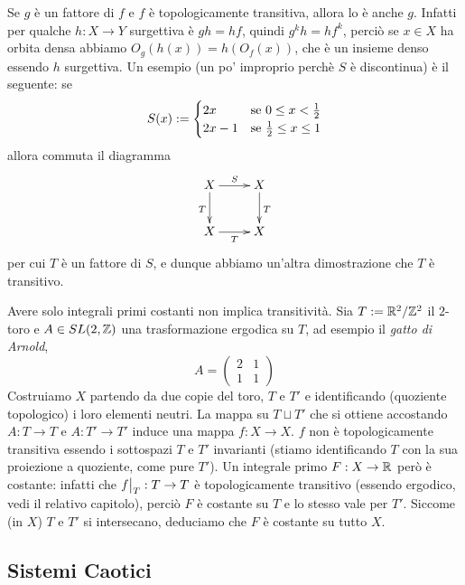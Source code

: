 \begin{esempio} Se $g$ è un fattore di $f$ e $f$ è topologicamente transitiva, allora lo è anche $g$.
Infatti per qualche $h:X\to Y$ surgettiva è $gh=hf$, quindi $g^k h=h f^k$, perciò
se $x\in X$ ha orbita densa abbiamo $O_g(h(x))=h(O_f(x))$, che è un insieme denso essendo $h$ surgettiva.\newline
Un esempio (un po' improprio perchè $S$ è discontinua) è il seguente: se
\[S(x):=\begin{cases}2x &\text{se }0\le x<\frac{1}{2} \\ 2x-1 &\text{se }\frac{1}{2}\le x\le 1\end{cases}\]
allora commuta il diagramma
\[ \xymatrix{X \ar[r]^S \ar[d]_T & X \ar[d]^T \\ X \ar[r]_T & X} \]
per cui $T$ è un fattore di $S$, e dunque abbiamo un'altra dimostrazione che $T$ è transitivo. 
\end{esempio}



\begin{esempio}[facoltativo] Avere solo integrali primi costanti non implica transitività. Sia $T:=\mathbb{R}^2/\mathbb{Z}^2$ il $2$-toro e $A\in SL(2,\mathbb{Z})$ una trasformazione ergodica
su $T$, ad esempio il \emph{gatto di Arnold},
\[A=\begin{pmatrix} 2 & 1 \\ 1 & 1 \end{pmatrix}\]
Costruiamo $X$ partendo da due copie del toro, $T$ e $T'$ e identificando (quoziente topologico) i loro elementi neutri. 
La mappa su $T\sqcup T'$ che si ottiene accostando $A:T\to T$ e $A:T'\to T'$ induce una mappa $f:X\to X$.
$f$ non è topologicamente transitiva essendo i sottospazi $T$ e $T'$ invarianti (stiamo identificando $T$ con la sua proiezione a quoziente,
come pure $T'$).
Un integrale primo $F:X\to \mathbb{R}$ però è costante: infatti che $\restr{f}{T}:T\to T$ è topologicamente transitivo 
(essendo ergodico, vedi il relativo capitolo),
perciò $F$ è costante su $T$ e lo stesso vale per $T'$. Siccome (in $X$) $T$ e $T'$ si intersecano, deduciamo che $F$ è costante su tutto $X$. 
\end{esempio}



\subsection{Sistemi Caotici}


